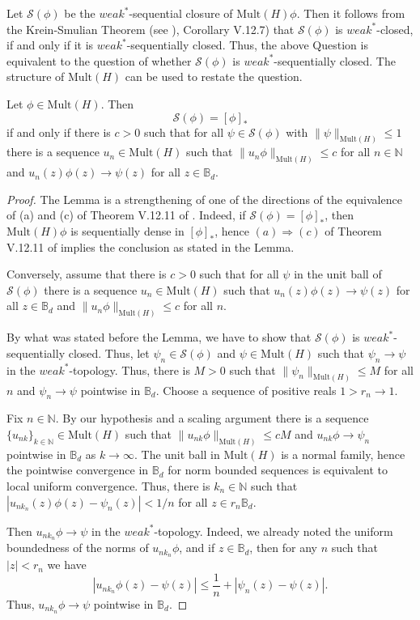 \documentclass{article}
\numberwithin{equation}{section}
\newcommand{\MH}{\mathrm{Mult}( H)}
\newcommand{\Bd}{\mathbb B_d}
\begin{document}
  Let $\mathcal S(\phi)$ be the $weak^\ast$-sequential closure of $\MH \phi$. Then it follows from the Krein-Smulian Theorem (see \cite{Conway1990}), Corollary V.12.7) that $\mathcal S(\phi)$ is $weak^\ast$-closed, if and only if it is $weak^\ast$-sequentially closed. Thus,  the above Question is equivalent to the question of whether $\mathcal S(\phi)$ is $weak^\ast$-sequentially closed. The  structure of $\MH$  can be used to restate the question.
  
  \begin{lem}  \label{lem:weak*} 
  Let $\phi\in \MH$. Then $$\mathcal S(\phi)=[\phi]_*$$ if and only if there is $c>0$ such that for all $\psi\in \mathcal S(\phi)$ with $\|\psi\|_{\MH}\le 1$ there is a sequence $u_n\in \MH$ such that $ \|u_n\phi\|_{\MH}\le c$ for all $n\in \mathbb
  {N}$ and $u_n(z) \phi(z) \to \psi(z)$ for all $z\in \Bd$.
  \end{lem}
  \begin{proof} The Lemma is a strengthening of one of the directions of the equivalence of (a) and (c) of Theorem V.12.11 of \cite{Conway1990}. Indeed, if $\mathcal S(\phi)=[\phi]_*$, then $\MH\phi$ is sequentially dense in $[\phi]_*$,  hence $(a)\Rightarrow (c)$ of  Theorem V.12.11 of \cite{Conway1990} implies the conclusion as stated in  the Lemma.
 
  
  Conversely, assume that there is $c>0$ such that for all $\psi$ in the unit ball of $\mathcal S(\phi)$ there is a sequence $u_n\in \MH$ such that $u_n(z) \phi(z) \to \psi(z)$ for all $z\in \Bd$ and $\|u_n\phi\|_{\MH}\le c$ for all $n$.
  
  By what was stated before the Lemma, we have to show that $\mathcal S(\phi)$ is $weak^\ast$-sequentially closed. Thus, let $ \psi_n \in \mathcal S(\phi)$ and $\psi\in \MH$ such that $\psi_n \to \psi$ in the $weak^\ast$-topology. Thus, there is $M>0$ such that $\|\psi_n\|_{\MH}\le M$ for all $n$ and $\psi_n \to \psi$ pointwise in $\Bd$. Choose a sequence of positive reals $1>r_n \to 1$.
  
  
  
  Fix $n\in \mathbb{N}$. By our hypothesis and a scaling argument there is a sequence $\{u_{nk}\}_{k\in \mathbb{N}}\in \MH$ such that $\|u_{nk}\phi\|_{\MH}\le cM$ and $u_{nk}\phi\to \psi_n$ pointwise in $\Bd$ as $k\to \infty$.
  The unit ball in $\MH$ is a normal family, hence the pointwise convergence in $\Bd$ for norm bounded sequences is equivalent to local uniform convergence. Thus,  there is $k_n\in \mathbb{N}$ such that $|u_{nk_n}(z)\phi(z)-\psi_n(z)|<1/n$ for all $z\in r_n\Bd$. 
  
  Then $u_{nk_n}\phi \to \psi$ in the $weak^\ast$-topology. Indeed, we already noted the uniform boundedness of the norms of $u_{nk_n}\phi$, and if $z\in \Bd$, then for any $n$ such that $|z|<r_n$ we have 
  $$|u_{nk_n}\phi(z)-\psi(z)|\le \frac{1}{n}+|\psi_n(z)-\psi(z)|.$$ Thus, $u_{nk_n}\phi \to \psi$ pointwise in $\Bd$.
  \end{proof}
\end{document}
